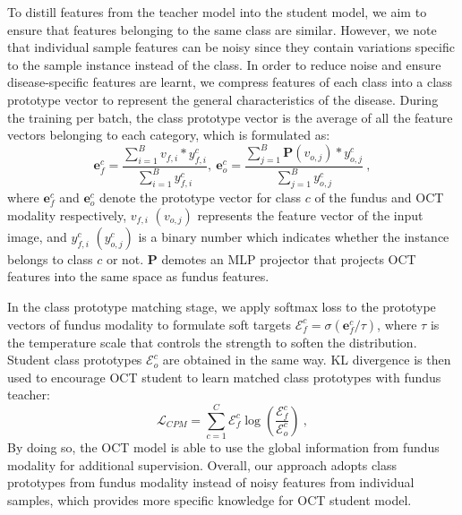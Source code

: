 \documentclass[runningheads]{llncs}
\newcommand{\wdai}[1]{{\color[rgb]{0.9,0.1,0.1}{#1}}}
\begin{document}
To distill features from the teacher model into the student model, we aim to ensure that features belonging to the same class are similar. However, we note that individual sample features can be noisy since they contain variations specific to the sample instance instead of the class. In order to reduce noise and ensure disease-specific features are learnt, 
we compress features of each class into a class prototype vector to represent the general characteristics of the disease. During the training per batch, the class prototype vector is the average of all the feature vectors belonging to each category, which is formulated as:
\begin{equation}
    \boldsymbol{e}^c_f=\frac{\sum_{i=1}^B{v_{f,i}*y_{f,i}^c}}{\sum_{i=1}^B{y_{f,i}^c}}, \ \boldsymbol{e}^c_o=\frac{\sum_{j=1}^B{{\mathbf{P}}\left(v_{o,j}\right)*y_{o,j}^c}}{\sum_{j=1}^B{y_{o,j}^c}} \:,
\end{equation}
where $\boldsymbol{e}^c_f$ and $\boldsymbol{e}^c_o$ denote the prototype vector for class $c$ of the fundus and OCT modality respectively, $v_{f,i}$ $\left( v_{o,j}\right)$ represents the feature vector of the input image, and $y_{f,i}^c$ $\left(y_{o,j}^c\right)$ is a binary number which indicates whether the instance belongs to class $c$ or not. $\mathbf{P}$ demotes an MLP projector that projects OCT features into the same space as fundus features.

In the class prototype matching stage, 
we apply softmax loss to the prototype vectors of fundus modality to formulate soft targets $\mathcal{E}_f^c=\sigma(\boldsymbol{e}_f^c/\tau)$, where $\tau$ is the temperature scale that controls the strength to soften the distribution. 
Student class prototypes $\mathcal{E}_o^c$ are obtained in the same way. KL divergence is then used to encourage OCT student to learn matched class prototypes with fundus teacher:
\begin{equation}
\mathcal{L}_{CPM}=\sum_{c=1}^C{\mathcal{E}_f^c\log{\left(\frac{\mathcal{E}_f^c}{\mathcal{E}_o^c}\right)} \:,}
\end{equation}
By doing so, the OCT model is able to use the global information from fundus modality for additional supervision. Overall, our approach adopts class prototypes from fundus modality instead of noisy features from individual samples, which provides more specific knowledge for OCT student model.
\end{document}
